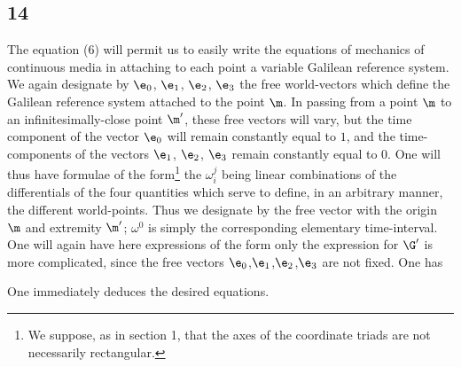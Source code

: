 \subsection*{14}
The equation (6) will permit us to easily write the equations of mechanics of continuous media in attaching to each point a variable Galilean reference system. We again designate by $\e_0$, $\e_1$, $\e_2$, $\e_3$ the free world-vectors which define the Galilean reference system attached to the point $\m$. In passing from a point $\m$ to an infinitesimally-close point $\m'$, these free vectors will vary, but the time component of the vector $\e_0$ will remain constantly equal to $1$, and the time-components of the vectors $\e_1$, $\e_2$, $\e_3$ remain constantly equal to $0$. One will thus have formulae of the form\footnote{We suppose, as in section 1, that the axes of the coordinate triads are not necessarily rectangular.}
the $\omega^j_i$ being linear combinations of the differentials of the four quantities which serve to define, in an arbitrary manner, the different world-points. Thus we designate by
the free vector with the origin $\m$ and extremity $\m'$; $\omega^0$ is simply the corresponding elementary time-interval. One will again have here expressions of the form
only the expression for $\G'$ is more complicated, since the free vectors $\e_0$,$\e_1$,$\e_2$,$\e_3$ are not fixed. One has

One immediately deduces the desired equations.

